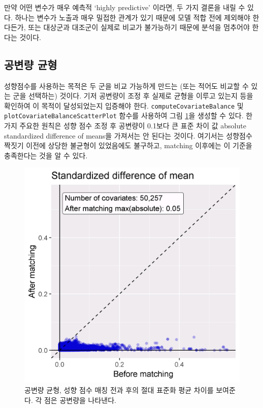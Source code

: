 \documentclass[11pt]{book}
\theoremstyle{definition}
\theoremstyle{definition}
\theoremstyle{definition}
\theoremstyle{remark}
\let\BeginKnitrBlock\begin \let\EndKnitrBlock\end
\begin{document}
\BeginKnitrBlock{rmdimportant}
만약 어떤 변수가 매우 예측적 `highly predictive' 이라면, 두 가지 결론을
내릴 수 있다. 하나는 변수가 노출과 매우 밀접한 관계가 있기 때문에 모델
적합 전에 제외해야 한다든가, 또는 대상군과 대조군이 실제로 비교가
불가능하기 때문에 분석을 멈추어야 한다는 것이다.
\EndKnitrBlock{rmdimportant}

\subsection{공변량 균형}\label{-}

성향점수를 사용하는 목적은 두 군을 비교 가능하게 만드는 (또는 적어도
비교할 수 있는 군을 선택하는) 것이다. 기저 공변량이 조정 후 실제로
균형을 이루고 있는지 등을 확인하여 이 목적이 달성되었는지 입증해야 한다.
\texttt{computeCovariateBalance} 및
\texttt{plotCovariateBalanceScatterPlot} 함수를 사용하여 그림
\ref{fig:balance}을 생성할 수 있다. 한 가지 주요한 원칙은 성향 점수 조정
후 공변량이 0.1보다 큰 표준 차이 값 absolute standardized difference of
means을 가져서는 안 된다는 것이다. 여기서는 성향점수 짝짓기 이전에
상당한 불균형이 있었음에도 불구하고, matching 이후에는 이 기준을
충족한다는 것을 알 수 있다.

\begin{figure}

{\centering \includegraphics[width=0.7\linewidth]{images/PopulationLevelEstimation/balance} 

}

\caption{공변량 균형, 성향 점수 매칭 전과 후의 절대 표준화 평균 차이를 보여준다. 각 점은 공변량을 나타낸다.}\label{fig:balance}
\end{figure}
\end{document}
